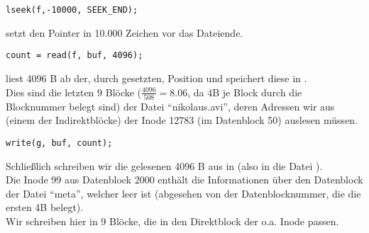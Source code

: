 \begin{lstlisting}[numbers=none]
lseek(f,-10000, SEEK_END);
\end{lstlisting}

 setzt den Pointer in  10.000 Zeichen vor das Dateiende.

\begin{lstlisting}[numbers=none]
count = read(f, buf, 4096);
\end{lstlisting}
 liest 4096 B ab der, durch  gesetzten, Position und speichert diese in .\\ Dies sind die letzten $9$ Blöcke ($\frac{4096}{508}=8.06$, da 4B je Block durch die Blocknummer belegt sind) der Datei ``nikolaus.avi'', deren Adressen wir aus (einem der Indirektblöcke) der Inode 12783 (im Datenblock 50) auslesen müssen.\\

\begin{lstlisting}[numbers=none]
write(g, buf, count);
\end{lstlisting}

Schließlich schreiben wir die gelesenen 4096 B aus  in  (also in die Datei ). \\
Die Inode 99 aus Datenblock 2000 enthält die Informationen über den Datenblock der Datei ``meta'', welcher leer ist (abgesehen von der Datenblocknummer, die die ersten 4B belegt).\\
Wir schreiben hier in 9 Blöcke, die in den Direktblock der o.a. Inode passen.
